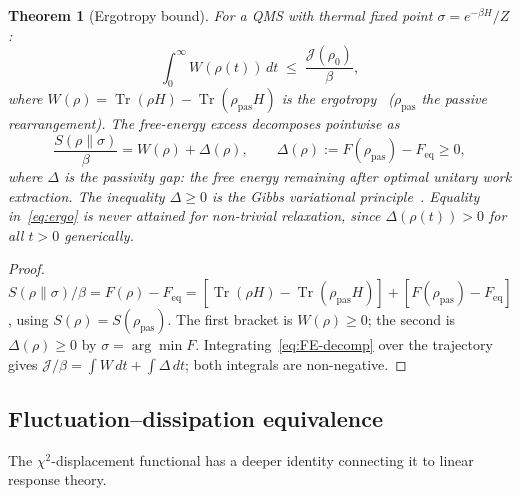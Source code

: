\documentclass[11pt,a4paper]{article}
\newtheorem{theorem}{Theorem}[section]
\theoremstyle{definition}
\theoremstyle{remark}
\DeclareMathOperator{\Tr}{Tr}
\begin{document}
\begin{theorem}[Ergotropy bound]\label{thm:ergotropy}
For a QMS with thermal fixed point $\sigma = e^{-\beta H}/Z$:
\begin{equation}\label{eq:ergo}
  \int_0^\infty W(\rho(t))\,dt
  \;\le\; \frac{\mathcal{J}(\rho_0)}{\beta},
\end{equation}
where $W(\rho) = \Tr(\rho H) - \Tr(\rho_{\mathrm{pas}}H)$ is the
ergotropy~\cite{Allahverdyan2004} ($\rho_{\mathrm{pas}}$ the passive
rearrangement).  The free-energy excess decomposes pointwise as
\begin{equation}\label{eq:FE-decomp}
  \frac{S(\rho\|\sigma)}{\beta} = W(\rho) + \Delta(\rho),
  \qquad
  \Delta(\rho) := F(\rho_{\mathrm{pas}}) - F_{\mathrm{eq}} \ge 0,
\end{equation}
where $\Delta$ is the \emph{passivity gap}: the free energy
remaining after optimal unitary work extraction.  The inequality
$\Delta \ge 0$ is the Gibbs variational
principle~\cite{Gibbs1902,Pusz1978}.
Equality in~\eqref{eq:ergo} is never attained for non-trivial
relaxation, since $\Delta(\rho(t)) > 0$ for all $t > 0$
generically.
\end{theorem}

\begin{proof}
$S(\rho\|\sigma)/\beta = F(\rho) - F_{\mathrm{eq}}
= [\Tr(\rho H) - \Tr(\rho_{\mathrm{pas}}H)]
+ [F(\rho_{\mathrm{pas}}) - F_{\mathrm{eq}}]$,
using $S(\rho) = S(\rho_{\mathrm{pas}})$.
The first bracket is $W(\rho) \ge 0$; the second is
$\Delta(\rho) \ge 0$ by $\sigma = \arg\min F$.
Integrating~\eqref{eq:FE-decomp} over the trajectory gives
$\mathcal{J}/\beta = \int W\,dt + \int\Delta\,dt$; both
integrals are non-negative.
\end{proof}

\subsection{Fluctuation--dissipation equivalence}\label{ssec:FDT}

The $\chi^2$-displacement functional has a deeper identity
connecting it to linear response theory.
\end{document}
